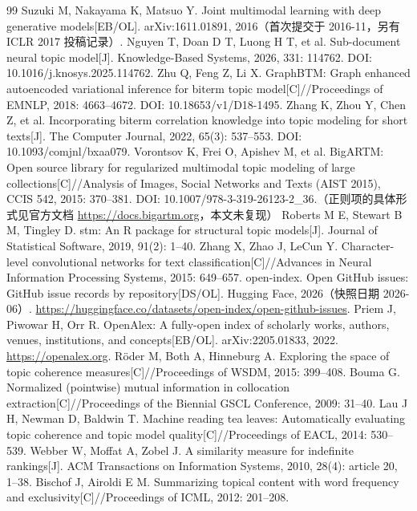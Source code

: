 \documentclass[11pt]{ctexart}
\begin{document}
\begin{thebibliography}{99}
 Suzuki M, Nakayama K, Matsuo Y. Joint multimodal learning with deep generative models[EB/OL]. arXiv:1611.01891, 2016（首次提交于 2016-11，另有 ICLR 2017 投稿记录）.
 Nguyen T, Doan D T, Luong H T, et al. Sub-document neural topic model[J]. Knowledge-Based Systems, 2026, 331: 114762. DOI: 10.1016/j.knosys.2025.114762.
 Zhu Q, Feng Z, Li X. GraphBTM: Graph enhanced autoencoded variational inference for biterm topic model[C]//Proceedings of EMNLP, 2018: 4663--4672. DOI: 10.18653/v1/D18-1495.
 Zhang K, Zhou Y, Chen Z, et al. Incorporating biterm correlation knowledge into topic modeling for short texts[J]. The Computer Journal, 2022, 65(3): 537--553. DOI: 10.1093/comjnl/bxaa079.
 Vorontsov K, Frei O, Apishev M, et al. BigARTM: Open source library for regularized multimodal topic modeling of large collections[C]//Analysis of Images, Social Networks and Texts (AIST 2015), CCIS 542, 2015: 370--381. DOI: 10.1007/978-3-319-26123-2\_36.（正则项的具体形式见官方文档 \url{https://docs.bigartm.org}，本文未复现）
 Roberts M E, Stewart B M, Tingley D. stm: An R package for structural topic models[J]. Journal of Statistical Software, 2019, 91(2): 1--40.
 Zhang X, Zhao J, LeCun Y. Character-level convolutional networks for text classification[C]//Advances in Neural Information Processing Systems, 2015: 649--657.
 open-index. Open GitHub issues: GitHub issue records by repository[DS/OL]. Hugging Face, 2026（快照日期 2026-06）. \url{https://huggingface.co/datasets/open-index/open-github-issues}.
 Priem J, Piwowar H, Orr R. OpenAlex: A fully-open index of scholarly works, authors, venues, institutions, and concepts[EB/OL]. arXiv:2205.01833, 2022. \url{https://openalex.org}.
 R\"oder M, Both A, Hinneburg A. Exploring the space of topic coherence measures[C]//Proceedings of WSDM, 2015: 399--408.
 Bouma G. Normalized (pointwise) mutual information in collocation extraction[C]//Proceedings of the Biennial GSCL Conference, 2009: 31--40.
 Lau J H, Newman D, Baldwin T. Machine reading tea leaves: Automatically evaluating topic coherence and topic model quality[C]//Proceedings of EACL, 2014: 530--539.
 Webber W, Moffat A, Zobel J. A similarity measure for indefinite rankings[J]. ACM Transactions on Information Systems, 2010, 28(4): article 20, 1--38.
 Bischof J, Airoldi E M. Summarizing topical content with word frequency and exclusivity[C]//Proceedings of ICML, 2012: 201--208.

\end{thebibliography}
\end{document}
